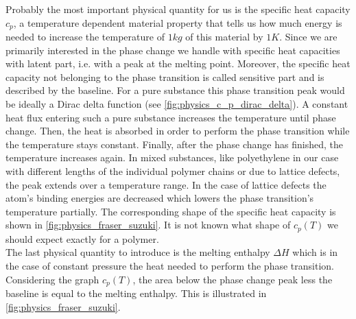 \documentclass{scrartcl}[12pt, halfparskip]
\numberwithin{equation}{section}
\numberwithin{figure}{section}
\numberwithin{table}{section}
\begin{document}
Probably the most important physical quantity for us is the specific heat capacity $c_p$, a temperature dependent material property that tells us how much energy is needed to increase the temperature of $1kg$ of this material by $1K$. 
Since we are primarily interested in the phase change we handle with specific heat capacities with latent part, i.e. with a peak at the melting point. Moreover, the specific heat capacity not belonging to the phase transition is called sensitive part and is described by the baseline. 
For a pure substance this phase transition peak would be ideally a Dirac delta function (see  \cref{fig:physics_c_p_dirac_delta}). A constant heat flux entering such a pure substance increases the temperature until phase change. Then, the heat is absorbed in order to perform the phase transition while the temperature stays constant. Finally, after the phase change has finished, the temperature increases again. 
In mixed substances, like polyethylene in our case with different lengths of the individual polymer chains or due to lattice defects, the peak extends over a temperature range. In the case of lattice defects the atom's binding energies are decreased which lowers the phase transition's temperature partially. The corresponding shape of the specific heat capacity is shown in \cref{fig:physics_fraser_suzuki}. It is not known what shape of $c_p(T)$ we should expect exactly for a polymer. \\
The last physical quantity to introduce is the melting enthalpy $\Delta H$ which is in the case of constant pressure the heat needed to perform the phase transition. Considering the graph $c_p(T)$, the area below the phase change peak less the baseline is equal to the melting enthalpy. This is illustrated in \cref{fig:physics_fraser_suzuki}.
\end{document}
